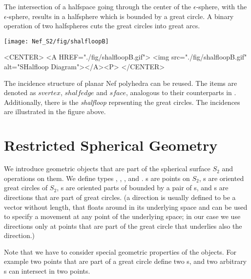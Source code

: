 The intersection of a halfspace going through the center of the $\epsilon$-sphere,
with the $\epsilon$-sphere, results in a halfsphere which is bounded by
a great circle. A binary operation of two halfspheres cuts the great circles
into great arcs.

\begin{ccTexOnly}
    \vspace{-7mm}
    \begin{center}
      \parbox{0.4\textwidth}{%
          \texttt{[image: Nef\_S2/fig/shalfloopB]}%
      }
    \end{center}
    \vspace{-5mm}
\end{ccTexOnly}

\begin{ccHtmlOnly}
    <CENTER>
    <A HREF="./fig/shalfloopB.gif">
        <img src="./fig/shalfloopB.gif" alt="SHalfloop Diagram"></A><P>
    </CENTER>
\end{ccHtmlOnly}

The incidence structure of planar Nef polyhedra can be reused. The items
are denoted as $svertex$, $shalfedge$ and $sface$, analogous 
to their counterparts in . Additionally, there is the
\emph{shalfloop} reprsenting the great circles. The incidences are 
illustrated in the figure above.

\section{Restricted Spherical Geometry}

We introduce geometric objects that are part of the spherical surface
$S_2$ and operations on them. We define types ,
, , and .
s are points on $S_2$, s are
oriented great circles of $S_2$, s are oriented
parts of  bounded by a pair of
s, and s are directions that
are part of great circles. (a direction is usually defined to be a
vector without length, that floats around in its underlying space and
can be used to specify a movement at any point of the underlying
space; in our case we use directions only at points that are part of
the great circle that underlies also the direction.)

Note that we have to consider special geometric properties of the
objects. For example two points that are part of a great circle define
two s, and two arbitrary s can
intersect in two points.

